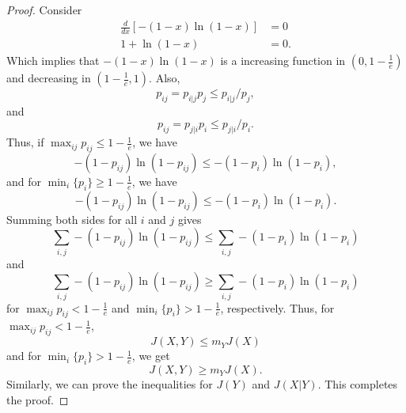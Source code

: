 \documentclass[pdflatex]{sn-jnl}%
\theoremstyle{thmstyleone}
\theoremstyle{thmstyletwo}%
\theoremstyle{thmstylethree}%
\begin{document}
\begin{proof}
    Consider 
    \begin{equation}
        \begin{split}
            \frac{d}{dx}\left[-\left(1-x \right) \ln\left(1-x \right)\right]&=0 \\
            1+\ln\left(1-x \right)&=0.
        \end{split}
    \end{equation}
Which implies that $-\left(1-x \right) \ln\left(1-x \right)$ is a increasing function in $\left(0, 1-\frac{1}{e}\right)$ and decreasing in $\left(1-\frac{1}{e},1\right)$. Also, 
\begin{equation}
p_{ij}=p_{i|j}p_j\leq p_{i|j}/ p_{j},
\end{equation}
and
\begin{equation}
p_{ij}=p_{j|i}p_i\leq p_{j|i}/ p_{i}.
\end{equation}
Thus, if $\max_{ij}p_{ij}\leq1-\frac{1}{e}$, we have 
\begin{equation}
    -\left(1-p_{ij} \right)\ln\left(1-p_{ij} \right)\leq -\left(1-p_{i} \right)\ln\left(1-p_{i} \right),
\end{equation}
and 
for $\min_{i}\{p_i\}\geq1-\frac{1}{e}$, we have
\begin{equation}
    -\left(1-p_{ij} \right)\ln\left(1-p_{ij} \right)\leq -\left(1-p_{i} \right)\ln\left(1-p_{i} \right).
\end{equation}
Summing both sides for all $i$ and $j$ gives
\begin{equation}
    \sum_{i,j}-\left(1-p_{ij} \right)\ln\left(1-p_{ij} \right)\leq\sum_{i,j} -\left(1-p_{i} \right)\ln\left(1-p_{i} \right)
\end{equation}
and 
\begin{equation}
    \sum_{i,j}-\left(1-p_{ij} \right)\ln\left(1-p_{ij} \right)\geq\sum_{i,j} -\left(1-p_{i} \right)\ln\left(1-p_{i} \right)
\end{equation}
for $\max_{ij}p_{ij}<1-\frac{1}{e}$ and $\min_{i}\{p_i\}>1-\frac{1}{e}$, respectively. Thus, for $\max_{ij}p_{ij}<1-\frac{1}{e}$,
\begin{equation}
    J\left(X,Y \right)\leq m_Y J\left(X \right)
\end{equation}
and for $\min_{i}\{p_i\}> 1-\frac{1}{e}$, we get
\begin{equation}
    J\left(X,Y \right)\geq m_Y J\left(X \right).
\end{equation}
Similarly, we can prove the inequalities for $J(Y)$ and $J(X|Y)$. This completes the proof.
\end{proof}
\end{document}
